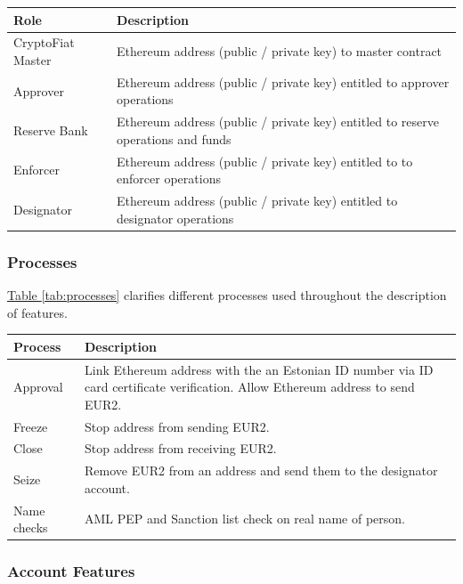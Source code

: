 \documentclass[12pt]{article} %
\newcommand{\hypertableref}[1]{\hyperref[#1]{Table \ref{#1}}}
\begin{document}
{{\begin{center}
\begin{tabular}{ | p{3cm} | p{12cm} | }
 \hline
 Role & Description
 \\ \hline\hline
 CryptoFiat Master & Ethereum address (public / private key) to master contract
 \\ \hline
 Approver & Ethereum address (public / private key) entitled to approver operations
 \\ \hline
 Reserve Bank & Ethereum address (public / private key) entitled to reserve operations and funds
 \\ \hline
 Enforcer & Ethereum address (public / private key) entitled to to enforcer operations
 \\ \hline
 Designator & Ethereum address (public / private key) entitled to designator operations
 \\ \hline
\end{tabular}
\end{center}
\label{tab:roles}

\subsubsection{Processes} \label{sssec:3.3:processes}

\hypertableref{tab:processes} clarifies different processes used throughout the description of features.

\begin{center}
\begin{tabular}{ | p{3cm} | p{12cm} | }
 \hline
 Process & Description
 \\ \hline\hline
 Approval & Link Ethereum address with the an Estonian ID number via ID card certificate verification. Allow Ethereum address to send EUR2.
 \\ \hline
 Freeze & Stop address from sending EUR2.
 \\ \hline
 Close & Stop address from receiving EUR2.
 \\ \hline
 Seize & Remove EUR2 from an address and send them to the designator account.
 \\ \hline
 Name checks & AML PEP and Sanction list check on real name of person.
 \\ \hline
\end{tabular}
\end{center}
\label{tab:processes}

\subsubsection{Account Features} \label{sssec:3.3:accounts}

}}
\end{document}
